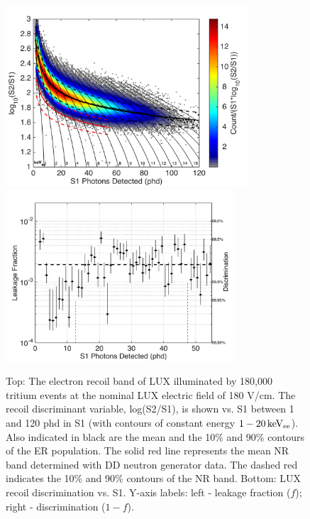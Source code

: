 \begin{figure}[h!]\centering
\includegraphics[width=90mm]{fig/CH3T_ER_Band.png}
\includegraphics[width=85mm]{fig/CH3T_Leakage_Run03.png}
\caption{Top: The electron recoil band of LUX illuminated by 180,000 tritium events at the nominal LUX electric field of 180 V/cm.  The recoil discriminant variable, log(S2/S1), is shown vs. S1 between 1 and 120 phd in S1 (with contours of constant energy $\rm1-20 \, keV_{ee}$). Also indicated in black are the mean and the 10\% and 90\% contours of the ER population. The solid red line represents the mean NR band determined with DD neutron generator data. The dashed red indicates the 10\% and 90\% contours of the NR band. Bottom: LUX recoil discrimination vs. S1. Y-axis labels: left -  leakage fraction ($f$); right - discrimination ($1-f$).}
\label{fig:ER_band}
\end{figure}




